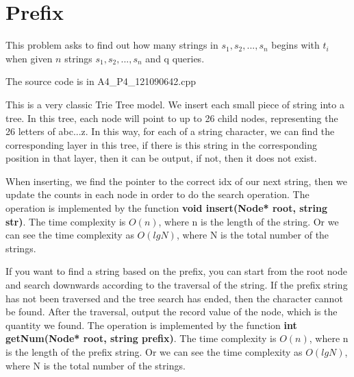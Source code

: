 \section{Prefix}
This problem asks to find out how many strings in $s_1, s_2,... , s_n$ begins with $t_i$ when given $n$ strings $s_1, s_2,... , s_n$ and q queries.

The source code is in A4\_P4\_121090642.cpp

This is a very classic Trie Tree model. We insert each small piece of string into a tree. In this tree, each node will point to up to 26 child nodes, representing the 26 letters of abc...z. In this way, for each of a string character, we can find the corresponding layer in this tree, if there is this string in the corresponding position in that layer, then it can be output, if not, then it does not exist.

When inserting, we find the pointer to the correct idx of our next string, then we update the counts in each node in order to do the search operation. The operation is implemented by the function \textbf{void insert(Node* root, string str)}. The time complexity is $O(n)$, where n is the length of the string. Or we can see the time complexity as $O(lgN)$, where N is the total number of the strings.

If you want to find a string based on the prefix, you can start from the root node and search downwards according to the traversal of the string. If the prefix string has not been traversed and the tree search has ended, then the character cannot be found. After the traversal, output the record value of the node, which is the quantity we found. The operation is implemented by the function \textbf{int getNum(Node* root, string prefix)}. The time complexity is $O(n)$, where n is the length of the prefix string. Or we can see the time complexity as $O(lgN)$, where N is the total number of the strings.
